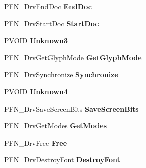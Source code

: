 \begin{DoxyCompactItemize}
P\+F\+N\+\_\+\+Drv\+End\+Doc {\bfseries End\+Doc}
\item 
\mbox{\label{struct___d_r_i_v_e_r___f_u_n_c_t_i_o_n_s_ab2b39abd391356b7fcd175646cd12dea}} 
P\+F\+N\+\_\+\+Drv\+Start\+Doc {\bfseries Start\+Doc}
\item 
\mbox{\label{struct___d_r_i_v_e_r___f_u_n_c_t_i_o_n_s_a4c0dee105cd224cf7c9aa57ed4512825}} 
\hyperlink{interfacevoid}{P\+V\+O\+ID} {\bfseries Unknown3}
\item 
\mbox{\label{struct___d_r_i_v_e_r___f_u_n_c_t_i_o_n_s_ab7e2d05e08c8ddcd8a945e1cb45a1e3c}} 
P\+F\+N\+\_\+\+Drv\+Get\+Glyph\+Mode {\bfseries Get\+Glyph\+Mode}
\item 
\mbox{\label{struct___d_r_i_v_e_r___f_u_n_c_t_i_o_n_s_a58b9f36359e2e4d69962c338b8a40148}} 
P\+F\+N\+\_\+\+Drv\+Synchronize {\bfseries Synchronize}
\item 
\mbox{\label{struct___d_r_i_v_e_r___f_u_n_c_t_i_o_n_s_abdb9f210c5b5e82639e5e1adafaf722b}} 
\hyperlink{interfacevoid}{P\+V\+O\+ID} {\bfseries Unknown4}
\item 
\mbox{\label{struct___d_r_i_v_e_r___f_u_n_c_t_i_o_n_s_ab05785d04d69c4cefa032040a0c6c1dc}} 
P\+F\+N\+\_\+\+Drv\+Save\+Screen\+Bits {\bfseries Save\+Screen\+Bits}
\item 
\mbox{\label{struct___d_r_i_v_e_r___f_u_n_c_t_i_o_n_s_a87fb927aa2301d16cee18b42e35a2abf}} 
P\+F\+N\+\_\+\+Drv\+Get\+Modes {\bfseries Get\+Modes}
\item 
\mbox{\label{struct___d_r_i_v_e_r___f_u_n_c_t_i_o_n_s_a40ea5311a2df668e368bcb26db696906}} 
P\+F\+N\+\_\+\+Drv\+Free {\bfseries Free}
\item 
\mbox{\label{struct___d_r_i_v_e_r___f_u_n_c_t_i_o_n_s_a94c735d016dd9aab483e3f7f8980cf6b}} 
P\+F\+N\+\_\+\+Drv\+Destroy\+Font {\bfseries Destroy\+Font}

\end{DoxyCompactItemize}
